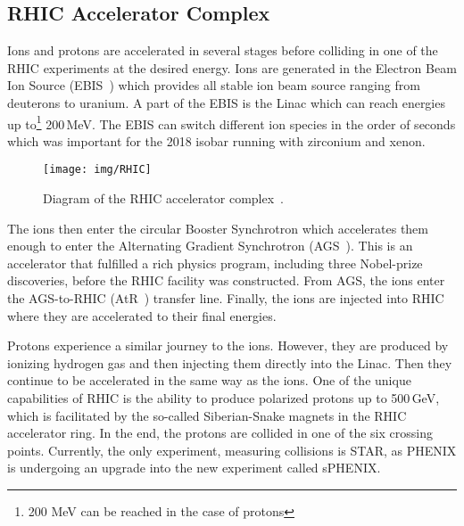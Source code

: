 

\subsection{RHIC Accelerator Complex}
Ions and protons are accelerated in several stages before colliding in one of the RHIC experiments at the desired energy. Ions are generated in the Electron Beam Ion Source (EBIS~\cite{EBIS}) which provides all stable ion beam source ranging from deuterons to uranium. A part of the EBIS is the Linac which can reach energies up to\footnote{200 MeV can be reached in the case of protons} 200$\,$MeV\@. The EBIS can switch different ion species in the order of seconds which was important for the 2018 isobar running with zirconium and xenon.

\begin{figure}[htb]
\begin{center}
 \texttt{[image: img/RHIC]}\\
\end{center}
\caption[Diagram of the RHIC accelerator complex.]{\label{RHICcomplex}Diagram of the RHIC accelerator complex~\cite{RHICpages}.}
\end{figure}

The ions then enter the circular Booster Synchrotron which accelerates them enough to enter the Alternating Gradient Synchrotron (AGS~\cite{AGS}). This is an accelerator that fulfilled a rich physics program, including three Nobel-prize discoveries, before the RHIC facility was constructed. From AGS, the ions enter the AGS-to-RHIC (AtR~\cite{AtR}) transfer line. Finally, the ions are injected into RHIC where they are accelerated to their final energies. 

Protons experience a similar journey to the ions. However, they are produced by ionizing hydrogen gas and then injecting them directly into the Linac. Then they continue to be accelerated in the same way as the ions. One of the unique capabilities of RHIC is the ability to produce polarized protons up to 500$\,$GeV, which is facilitated by the so-called Siberian-Snake magnets in the RHIC accelerator ring. In the end, the protons are collided in one of the six crossing points. Currently, the only experiment, measuring collisions is STAR, as PHENIX is undergoing an upgrade into the new experiment called sPHENIX\@.





